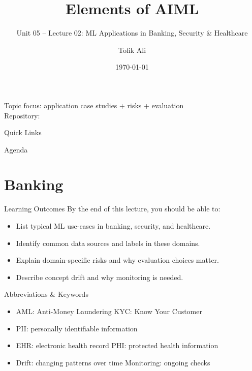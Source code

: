 \documentclass[aspectratio=169]{beamer}
\title[Elements of AIML]{Elements of AIML}
\subtitle{Unit 05 -- Lecture 02: ML Applications in Banking, Security \& Healthcare}
\author{Tofik Ali}
\institute{School of Computer Science, UPES Dehradun}
\date{\today}
\begin{document}
\UPESCoverFrame
\setcounter{framenumber}{0}

\begin{frame}
  \titlepage
  \vspace{0.3em}
  \begin{center}
    \footnotesize Topic focus: application case studies + risks + evaluation\\[0.25em]
    \footnotesize Repository: \texttt{\AIMLRepoURL}
  \end{center}
  \slidesources{\AIMLUnitVSources}
\end{frame}

\begin{frame}{Quick Links}
  \centering
  \hyperlink{sec:bank}{}\hspace{0.6em}
  \hyperlink{sec:sec}{}\hspace{0.6em}
  \hyperlink{sec:health}{}\hspace{0.6em}
  \hyperlink{sec:risks}{}\hspace{0.6em}
  \hyperlink{sec:summary}{}
\end{frame}

\begin{frame}{Agenda}
  \tableofcontents
\end{frame}

\section{Banking}
\label{sec:bank}

\begin{frame}{Learning Outcomes}
  By the end of this lecture, you should be able to:
  \begin{itemize}[<+->]
    \item List typical ML use-cases in banking, security, and healthcare.
    \item Identify common data sources and labels in these domains.
    \item Explain domain-specific risks and why evaluation choices matter.
    \item Describe concept drift and why monitoring is needed.
  \end{itemize}
\end{frame}

\begin{frame}{Abbreviations \& Keywords}
  \begin{itemize}[<+->]
    \item AML: Anti-Money Laundering \hfill KYC: Know Your Customer
    \item PII: personally identifiable information
    \item EHR: electronic health record \hfill PHI: protected health information
    \item Drift: changing patterns over time \hfill Monitoring: ongoing checks
  \end{itemize}
\end{frame}
\end{document}
